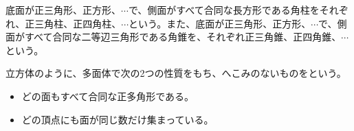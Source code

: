 \documentclass[
  14pt,a4paper,lualatex,ja=standard]{bxjsarticle}
\begin{document}
底面が正三角形、正方形、\(\cdots\)で、側面がすべて合同な長方形である角柱をそれぞれ、正三角柱、正四角柱、\(\cdots\)という。また、底面が正三角形、正方形、\(\cdots\)で、側面がすべて合同な二等辺三角形である角錐を、それぞれ正三角錐、正四角錐、\(\cdots\)という。

立方体のように、多面体で次の2つの性質をもち、へこみのないものをという。

\setcounter{kaunta}{0}
\begin{itemize}
\item[\noindent\fbox{\large\makebox[1em]{\text{\refstepcounter{kaunta}%
\arabic{kaunta}}}} \hspace{1pt}] どの面もすべて合同な正多角形である。
\item[\noindent\fbox{\large\makebox[1em]{\text{\refstepcounter{kaunta}%
\arabic{kaunta}}}} \hspace{1pt}] どの頂点にも面が同じ数だけ集まっている。
\end{itemize}
\end{document}
